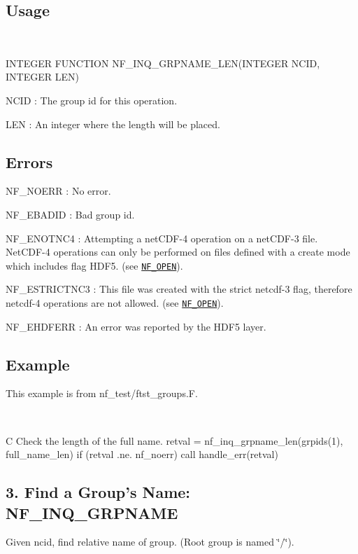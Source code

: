\subsection*{Usage }

 

I\+N\+T\+E\+G\+ER F\+U\+N\+C\+T\+I\+ON N\+F\+\_\+\+I\+N\+Q\+\_\+\+G\+R\+P\+N\+A\+M\+E\+\_\+\+L\+E\+N(\+I\+N\+T\+E\+G\+E\+R N\+C\+I\+D, I\+N\+T\+E\+G\+E\+R L\+E\+N)

{\ttfamily N\+C\+ID} \+: The group id for this operation.

{\ttfamily L\+EN} \+: An integer where the length will be placed.

\subsection*{Errors }

{\ttfamily N\+F\+\_\+\+N\+O\+E\+RR} \+: No error.

{\ttfamily N\+F\+\_\+\+E\+B\+A\+D\+ID} \+: Bad group id.

{\ttfamily N\+F\+\_\+\+E\+N\+O\+T\+N\+C4} \+: Attempting a net\+C\+D\+F-\/4 operation on a net\+C\+D\+F-\/3 file. Net\+C\+D\+F-\/4 operations can only be performed on files defined with a create mode which includes flag H\+D\+F5. (see \href{#NF_005fOPEN}{\tt N\+F\+\_\+\+O\+P\+EN}).

{\ttfamily N\+F\+\_\+\+E\+S\+T\+R\+I\+C\+T\+N\+C3} \+: This file was created with the strict netcdf-\/3 flag, therefore netcdf-\/4 operations are not allowed. (see \href{#NF_005fOPEN}{\tt N\+F\+\_\+\+O\+P\+EN}).

{\ttfamily N\+F\+\_\+\+E\+H\+D\+F\+E\+RR} \+: An error was reported by the H\+D\+F5 layer.

\subsection*{Example }

This example is from nf\+\_\+test/ftst\+\_\+groups.\+F.

 

C Check the length of the full name. retval = nf\+\_\+inq\+\_\+grpname\+\_\+len(grpids(1), full\+\_\+name\+\_\+len) if (retval .ne. nf\+\_\+noerr) call handle\+\_\+err(retval)\hypertarget{nc_f77_interface_guide_f77_NF-INQ-GRPNAME}{}\subsection{3. Find a Group’s Name\+: N\+F\+\_\+\+I\+N\+Q\+\_\+\+G\+R\+P\+N\+A\+M\+E }\label{nc_f77_interface_guide_f77_NF-INQ-GRPNAME}
Given ncid, find relative name of group. (Root group is named \char`\"{}/\char`\"{}).

